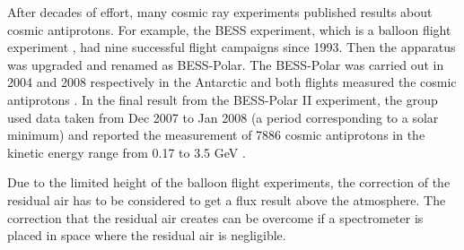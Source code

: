 After decades of effort, many cosmic ray experiments published results about cosmic antiprotons. For example, the BESS experiment, which is a balloon flight experiment \cite{BESSExperiment}, had nine successful flight campaigns since 1993. Then the apparatus was upgraded and renamed as BESS-Polar. The BESS-Polar was carried out in 2004 and 2008 respectively in the Antarctic \cite{BESSPolarExperiment1, BESSPolarExperiment2} and both flights measured the cosmic antiprotons \cite{BESSPolar1AntiprotonPaper, BESSPolar2AntiprotonPaper}. In the final result from the BESS-Polar II experiment, the group used data taken from Dec 2007 to Jan 2008 (a period corresponding to a  solar minimum) and reported the measurement of 7886 cosmic antiprotons in the kinetic energy range from 0.17 to 3.5 GeV \cite{BESSPolar2AntiprotonPaper}. 

Due to the limited height of the balloon flight experiments, the correction of the residual air has to be considered to get a flux result above the atmosphere. The correction that the residual air creates can be overcome if a spectrometer is placed in space where the residual air is negligible. 

